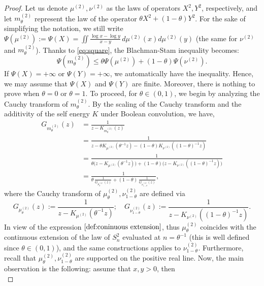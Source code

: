 \documentclass[10pt, reqno]{amsart}
\numberwithin{equation}{section}
\theoremstyle{definition}
\theoremstyle{plain}
\theoremstyle{remark}
\newcommand{\1}{\mathbbm{1}}
\begin{document}
\begin{proof}
    Let us denote $ \mu^{(2)}, \nu^{(2)} $ as the laws of operators $ X^2, Y^2 $, respectively, and let $ m^{(2)}_{\theta} $ represent the law of the operator $ \theta X^2 + (1-\theta) Y^2 $. For the sake of simplifying the notation, we still write $\Psi({\mu^{(2)}}):= \Psi(X)=\iint \frac{\log x -\log y}{x-y}\,d\mu^{(2)}(x)d\mu^{(2)}(y)$ (the same for $\nu^{(2)}$ and $m^{(2)}_\theta$). Thanks to \eqref{eq:square}, the Blachman-Stam inequality becomes:
    \begin{equation*}
        \Psi(m^{(2)}_{\theta})\leq \theta \Psi(\mu^{(2)}) + (1-\theta)\Psi(\nu^{(2)}).
    \end{equation*}
    If $\Psi(X)=+\infty$ or $\Psi(Y)=+\infty$, we automatically have the inequality. Hence, we may assume that $\Psi(X)$ and $\Psi(Y)$ are finite. Moreover, there is nothing to prove when $\theta=0$ or $\theta=1$. To proceed, for $\theta\in (0,1)$, we begin by analyzing the Cauchy transform of $ m^{(2)}_\theta $. By the scaling of the Cauchy transform and the additivity of the self energy $K$ under Boolean convolution, we have,
    \begin{align}\label{eq:antilinearrelation}
G_{m^{(2)}_{\theta}}(z)
&=\frac{1}{z-K_{m^{(2)}_{\theta}}(z)}\\
&=\frac{1}{z-\theta K_{\mu^{(2)}}(\theta^{-1}z)-(1-\theta)K_{\nu^{(2)}}((1-\theta)^{-1}z)}\nonumber\\
&=\frac{1}{\theta\bigl(z-K_{\mu^{(2)}}(\theta^{-1}z)\bigr)+(1-\theta)\bigl(z-K_{\nu^{(2)}}((1-\theta)^{-1}z)\bigr)}\nonumber\\
&=\frac{1}{\theta\,\frac{1}{G_{\mu^{(2)}_{\theta}}(z)}+(1-\theta)\,\frac{1}{G_{\nu^{(2)}_{1-\theta}}(z)}},
\end{align}
    where the Cauchy transform of $\mu^{(2)}_\theta,\nu^{(2)}_{1-\theta}$ are defined via
		\begin{equation*}
			G_{\mu^{(2)}_\theta}(z):= \frac{1}{ z- K_{\mu^{(2)}}(\theta^{-1}z) }; \quad G_{\nu^{(2)}_{1-\theta}}(z):= \frac{1}{ z- K_{\nu^{(2)}}((1-\theta)^{-1}z) }.
		\end{equation*}
		In view of the expression $\eqref{def:coninuous extension}$, thus $\mu^{(2)}_{\theta}$ coincides with the continuous extension of the law of $S_n^2$ evaluated at $n=\theta^{-1}$ (this is well defined since $\theta\in (0,1)$), and the same constructions applies to $\nu^{(2)}_{1-\theta}$. Furthermore, recall that $\mu^{(2)}_\theta,\nu^{(2)}_{1-\theta}$ are supported on the positive real line. Now, the main observation is the following: assume that $x,y>0$, then
        \begin{equation*}

\end{equation*}
\end{proof}
\end{document}

